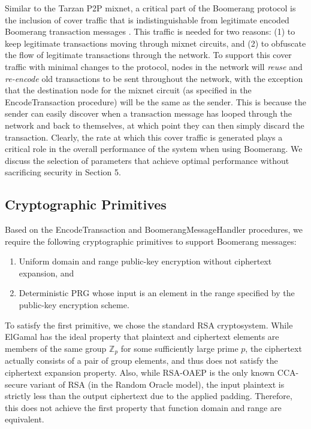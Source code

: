 
Similar to the Tarzan P2P mixnet, a critical part of the Boomerang protocol is the inclusion of cover traffic that is indistinguishable from legitimate encoded Boomerang transaction messages \cite{tarzan}. This traffic is needed for two reasons: (1) to keep legitimate transactions moving through mixnet circuits, and (2) to obfuscate the flow of legitimate transactions through the network. To support this cover traffic with minimal changes to the protocol, nodes in the network will \emph{reuse} and \emph{re-encode} old transactions to be sent throughout the network, with the exception that the destination node for the mixnet circuit (as specified in the {\sf EncodeTransaction} procedure) will be the same as the sender. This is because the sender can easily discover when a transaction message has looped through the network and back to themselves, at which point they can then simply discard the transaction. Clearly, the rate at which this cover traffic is generated plays a critical role in the overall performance of the system when using Boomerang. We discuss the selection of parameters that achieve optimal performance without sacrificing security in Section 5. 

\subsection{Cryptographic Primitives}


Based on the {\sf EncodeTransaction} and {\sf BoomerangMessageHandler} procedures, we require the following cryptographic primitives to support Boomerang messages:
\begin{enumerate}
	\item Uniform domain and range public-key encryption without ciphertext expansion, and
	\item Deterministic PRG whose input is an element in the range specified by the public-key encryption scheme.
\end{enumerate}

To satisfy the first primitive, we chose the standard RSA cryptosystem. While ElGamal has the ideal property that plaintext and ciphertext elements are members of the same group $\mathbb{Z}_p$ for some sufficiently large prime $p$, the ciphertext actually consists of a pair of group elements, and thus does not satisfy the ciphertext expansion property. Also, while RSA-OAEP is the only known CCA-secure variant of RSA (in the Random Oracle model), the input plaintext is strictly less than the output ciphertext due to the applied padding. Therefore, this does not achieve the first property that function domain and range are equivalent. 

